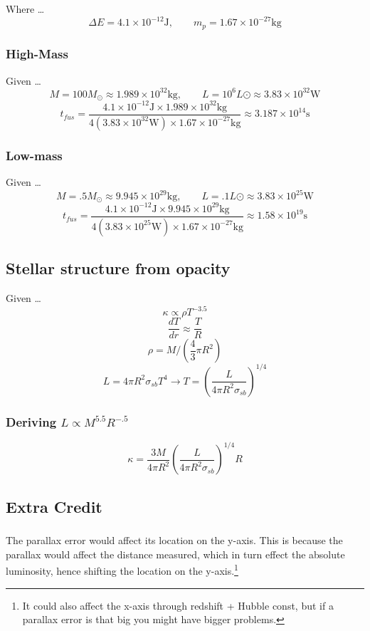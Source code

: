 \documentclass{article}
\begin{document}
Where \dots
    \[\Delta E = 4.1 \times 10^{-12} \text{J}, \qquad m_p = 1.67 \times 10^{-27} \text{kg}\]
\subsubsection{High-Mass}
Given \dots
\[M = 100 M_\odot \approx 1.989 \times 10^{32} \text{kg}, \qquad  L = 10^6 L\odot \approx 3.83 \times 10^{32} \text{W}\]
\[t_{fus} = \frac{4.1 \times 10^{-12} \text{J} \times 1.989 \times 10^{32} \text{kg}}{4(3.83 \times 10^{32} \text{W})\times 1.67 \times 10^{-27} \text{kg}} \approx 3.187 \times 10^{14} \text{s}\]
\subsubsection{Low-mass}
Given \dots
\[M = .5 M_\odot \approx 9.945 \times 10^{29} \text{kg}, \qquad  L = .1 L\odot \approx 3.83 \times 10^{25} \text{W}\]
\[t_{fus} = \frac{4.1 \times 10^{-12} \text{J} \times 9.945 \times 10^{29} \text{kg}}{4(3.83 \times 10^{25} \text{W})\times 1.67 \times 10^{-27} \text{kg}} \approx 1.58 \times 10^{19} \text{s}\]

\subsection{Stellar structure from opacity}
Given \dots
\[\kappa \propto \rho T^{-3.5}\]
\[\frac{dT}{dr} \approx \frac{T}{R}\]
\[\rho = M / (\frac{4}{3}\pi R^2)\]
\[L=4\pi R^2 \sigma_{sb} T^4 \rightarrow T = \left( \frac{L}{4 \pi R^2 \sigma_{sb}} \right)^{1/4}\]

\subsubsection{Deriving \(L \propto M^{5.5} R^{-.5} \)}
\[\kappa = \frac{3M}{4\pi R^2}  \left(\frac{L}{4\pi R^2\sigma_{sb}}\right)^{1/4}R\]
\subsection{Extra Credit}
\subsubsection{}
The parallax error would affect its location on the y-axis. This is because the parallax would affect the distance measured, which in turn effect the absolute luminosity, hence shifting the location on the y-axis.\footnote{It could also affect the x-axis through redshift + Hubble const, but if a parallax error is that big you might have bigger problems.}
\end{document}
